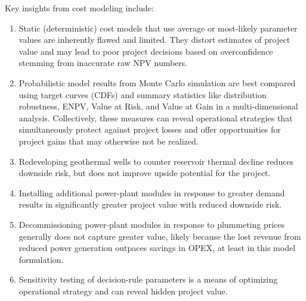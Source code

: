 \noindent
Key insights from cost modeling include:
\begin{enumerate}
    \item Static (deterministic) cost models that use average or most-likely parameter values are inherently flawed and limited. They distort estimates of project value and may lead to poor project decisions based on overconfidence stemming from inaccurate raw NPV numbers.
    \item Probabilistic model results from Monte Carlo simulation are best compared using target curves (CDFs) and summary statistics like distribution robustness, ENPV, Value at Risk, and Value at Gain in a multi-dimensional analysis. Collectively, these measures can reveal operational strategies that simultaneously protect against project losses and offer opportunities for project gains that may otherwise not be realized.
    \item Redeveloping geothermal wells to counter reservoir thermal decline reduces downside risk, but does not improve upside potential for the project.
    \item Installing additional power-plant modules in response to greater demand results in significantly greater project value with reduced downside risk.
    \item Decommissioning power-plant modules in response to plummeting prices generally does not capture greater value, likely because the lost revenue from reduced power generation outpaces savings in OPEX, at least in this model formulation.
    \item Sensitivity testing of decision-rule parameters is a means of optimizing operational strategy and can reveal hidden project value.
\end{enumerate}